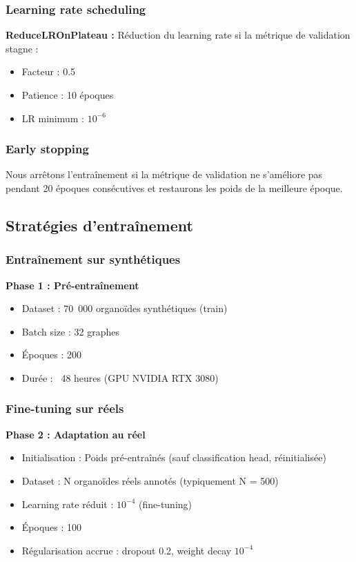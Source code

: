 \subsubsection{Learning rate scheduling}

\textbf{ReduceLROnPlateau :}
Réduction du learning rate si la métrique de validation stagne :
\begin{itemize}
    \item Facteur : 0.5
    \item Patience : 10 époques
    \item LR minimum : $10^{-6}$
\end{itemize}

\subsubsection{Early stopping}

Nous arrêtons l'entraînement si la métrique de validation ne s'améliore pas pendant 20 époques consécutives et restaurons les poids de la meilleure époque.

\subsection{Stratégies d'entraînement}

\subsubsection{Entraînement sur synthétiques}

\textbf{Phase 1 : Pré-entraînement}
\begin{itemize}
    \item Dataset : 70~000 organoïdes synthétiques (train)
    \item Batch size : 32 graphes
    \item Époques : 200
    \item Durée : ~48 heures (GPU NVIDIA RTX 3080)
\end{itemize}

\subsubsection{Fine-tuning sur réels}

\textbf{Phase 2 : Adaptation au réel}
\begin{itemize}
    \item Initialisation : Poids pré-entraînés (sauf classification head, réinitialisée)
    \item Dataset : N organoïdes réels annotés (typiquement N = 500)
    \item Learning rate réduit : $10^{-4}$ (fine-tuning)
    \item Époques : 100
    \item Régularisation accrue : dropout 0.2, weight decay $10^{-4}$
\end{itemize}

